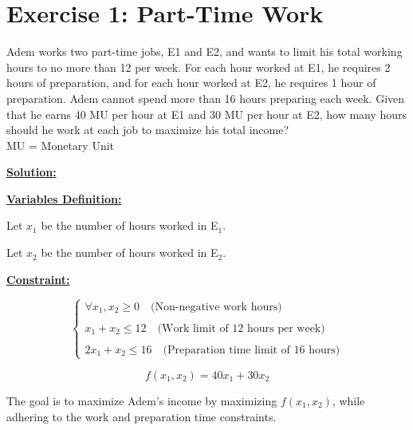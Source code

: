 \section{Exercise 1: Part-Time Work}
Adem works two part-time jobs, E1 and E2, and wants to limit his total working hours to no more than 12 per week. For each hour worked
at E1, he requires 2 hours of preparation, and for each hour worked at E2, he requires 1 hour of preparation. Adem cannot spend
more than 16 hours preparing each week. Given that he earns 40 MU per hour at E1 and 30 MU per hour at E2, how many hours should
he work at each job to maximize his total income?\\
MU = Monetary Unit

\vspace{1.5cm}
\textbf{\underline{\Large Solution:}}
\begin{multicols}{2}
\textbf{\underline{Variables Definition:}}

Let \(x_1\) be the number of hours worked in E$_{1}$.

Let \(x_2\) be the number of hours worked in E$_{2}$.
\columnbreak

\textbf{\underline{Constraint:}} 

\[
\left\{
    \begin{array}{l}
       \forall x_1, x_2 \geq 0 \quad \text{(Non-negative work hours)}\\\\
        x_1 + x_2 \leq 12 \quad \text{(Work limit of 12 hours per week)}\\\\
        2x_1 + x_2 \leq 16 \quad \text{(Preparation time limit of 16 hours)}
   \end{array}
   \right.
\] 
\end{multicols}
\vspace{0.5cm}
\begin{tcolorbox}[title = Objectif Function]
\[
f(x_1,x_2) = 40x_1 + 30x_2 
\]
\begin{center}
The goal is to maximize Adem's income by maximizing \(f(x_1,x_2)\), while adhering to the work and preparation time constraints.
\end{center}
\end{tcolorbox}
